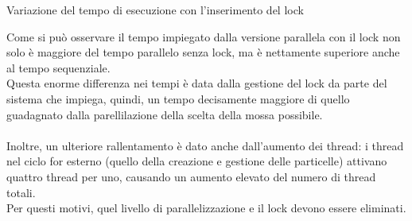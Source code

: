 \documentclass[10pt,twocolumn,letterpaper]{article}
\begin{document}
\begin{table}[H]
\caption{Variazione del tempo di esecuzione con l'inserimento del lock}
\label{t4}
\end{table}
Come si può osservare il tempo impiegato dalla versione parallela con il lock non solo è maggiore del tempo parallelo senza lock, ma è nettamente superiore anche al tempo sequenziale.\\
Questa enorme differenza nei tempi è data dalla gestione del lock da parte del sistema che impiega, quindi, un tempo decisamente maggiore di quello guadagnato dalla parellilazione della scelta della mossa possibile.\\
\\
Inoltre, un ulteriore rallentamento è dato anche dall'aumento dei thread: i thread nel ciclo for esterno (quello della creazione e gestione delle particelle) attivano quattro thread per uno, causando un aumento elevato del numero di thread totali.\\
Per questi motivi, quel livello di parallelizzazione e il lock devono essere eliminati.
\end{document}
